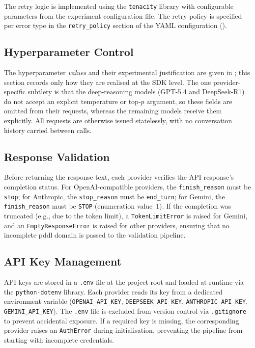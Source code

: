 The retry logic is implemented using the \texttt{tenacity} library with configurable parameters from the experiment configuration file.
The retry policy is specified per error type in the \texttt{retry\_policy} section of the YAML configuration ().

\subsection{Hyperparameter Control}
\label{sec:impl:llm:hyperparams}

The hyperparameter \emph{values} and their experimental justification are given in ; this section records only how they are realised at the SDK level.
The one provider-specific subtlety is that the deep-reasoning models (GPT-5.4 and DeepSeek-R1) do not accept an explicit temperature or top-$p$ argument, so these fields are omitted from their requests, whereas the remaining models receive them explicitly.
All requests are otherwise issued statelessly, with no conversation history carried between calls.

\subsection{Response Validation}
\label{sec:impl:llm:validation}

Before returning the response text, each provider verifies the API response's completion status.
For OpenAI-compatible providers, the \texttt{finish\_reason} must be \texttt{stop}; for Anthropic, the \texttt{stop\_reason} must be \texttt{end\_turn}; for Gemini, the \texttt{finish\_reason} must be \texttt{STOP} (enumeration value~1).
If the completion was truncated (e.g., due to the token limit), a \texttt{TokenLimitError} is raised for Gemini, and an \texttt{EmptyResponseError} is raised for other providers, ensuring that no incomplete \gls{pddl} domain is passed to the validation pipeline.

\subsection{API Key Management}
\label{sec:impl:llm:keys}

API keys are stored in a \texttt{.env} file at the project root and loaded at runtime via the \texttt{python-dotenv} library.
Each provider reads its key from a dedicated environment variable (\texttt{OPENAI\_API\_KEY}, \texttt{DEEPSEEK\_API\_KEY}, \texttt{ANTHROPIC\_API\_KEY}, \texttt{GEMINI\_API\_KEY}).
The \texttt{.env} file is excluded from version control via \texttt{.gitignore} to prevent accidental exposure.
If a required key is missing, the corresponding provider raises an \texttt{AuthError} during initialisation, preventing the pipeline from starting with incomplete credentials.
